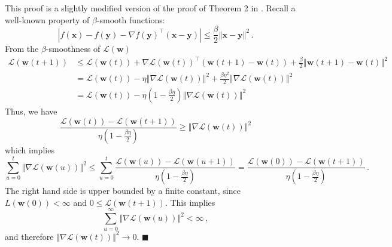 \documentclass[twoside,11pt,english]{article}
\begin{document}
This proof is a slightly modified version of the proof of Theorem
2 in \citep{Ganti2015}. Recall a well-known property of $\beta$-smooth
functions: %
\begin{equation}
\left|f\left(\mathbf{x}\right)-f\left(\mathbf{y}\right)-\nabla f\left(\mathbf{y}\right)^{\top}\left(\mathbf{x-y}\right)\right|\leq\frac{\beta}{2}\left\Vert \mathbf{x}-\mathbf{y}\right\Vert ^{2}\,.\label{eq: propery of beta smoothness}
\end{equation}
From the $\beta$-smoothness of $\mathcal{L}\left(\mathbf{w}\right)$
\begin{align*}
\mathcal{L}\left(\mathbf{w}\left(t+1\right)\right) & \leq\mathcal{L}\left(\mathbf{w}\left(t\right)\right)+\nabla\mathcal{L}\left(\mathbf{w}\left(t\right)\right)^{\top}\left(\mathbf{w}\left(t+1\right)-\mathbf{w}\left(t\right)\right)+\frac{\beta}{2}\left\Vert \mathbf{w}\left(t+1\right)-\mathbf{w}\left(t\right)\right\Vert ^{2}\\
 & =\mathcal{L}\left(\mathbf{w}\left(t\right)\right)-\eta\left\Vert \nabla\mathcal{L}\left(\mathbf{w}\left(t\right)\right)\right\Vert ^{2}+\frac{\beta\eta^{2}}{2}\left\Vert \nabla\mathcal{L}\left(\mathbf{w}\left(t\right)\right)\right\Vert ^{2}\\
 & =\mathcal{L}\left(\mathbf{w}\left(t\right)\right)-\eta\left(1-\frac{\beta\eta}{2}\right)\left\Vert \nabla\mathcal{L}\left(\mathbf{w}\left(t\right)\right)\right\Vert ^{2}
\end{align*}
Thus, we have 
\[
\frac{\mathcal{L}\left(\mathbf{w}\left(t\right)\right)-\mathcal{L}\left(\mathbf{w}\left(t+1\right)\right)}{\eta\left(1-\frac{\beta\eta}{2}\right)}\geq\left\Vert \nabla\mathcal{L}\left(\mathbf{w}\left(t\right)\right)\right\Vert ^{2}
\]
which implies 
\[
\sum_{u=0}^{t}\left\Vert \nabla\mathcal{L}\left(\mathbf{w}\left(u\right)\right)\right\Vert ^{2}\leq\sum_{u=0}^{t}\frac{\mathcal{L}\left(\mathbf{w}\left(u\right)\right)-\mathcal{L}\left(\mathbf{w}\left(u+1\right)\right)}{\eta\left(1-\frac{\beta\eta}{2}\right)}=\frac{\mathcal{L}\left(\mathbf{w}\left(0\right)\right)-\mathcal{L}\left(\mathbf{w}\left(t+1\right)\right)}{\eta\left(1-\frac{\beta\eta}{2}\right)}\,.
\]
The right hand side is upper bounded by a finite constant, since $L\left(\mathbf{w}\left(0\right)\right)<\infty$
and $0\leq\mathcal{L}\left(\mathbf{w}\left(t+1\right)\right)$. This
implies 
\[
\sum_{u=0}^{\infty}\left\Vert \nabla\mathcal{L}\left(\mathbf{w}\left(u\right)\right)\right\Vert ^{2}<\infty\,,
\]
and therefore $\left\Vert \nabla\mathcal{L}\left(\mathbf{w}\left(t\right)\right)\right\Vert ^{2}\rightarrow0$.  $\blacksquare$
\end{document}

